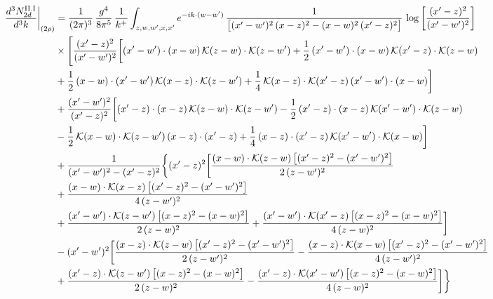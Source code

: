 \documentclass[9pt]{article}
\numberwithin{equation}{section}
\begin{document}
\begin{align}
\frac{d^{3}N^{\rm II.I}_{2d}}{d^{3}k}\bigg|_{(2\rho)}&= \frac{1}{(2\pi)^{3}}\,\frac{g^{4}}{8\pi^{5}}\,\frac{1}{k^{+}}\int_{z,w,w^{\prime},x,x^{\prime}}e^{-ik\cdot(w-w^{\prime})}\,\frac{1}{\big[(x^{\prime}-w^{\prime})^{2}\,(x-z)^{2}-(x-w)^{2}\,(x^{\prime}-z)^{2}\big]}\,\log\left[\frac{(x^{\prime}-z)^{2}}{(x^{\prime}-w^{\prime})^{2}}\right]\notag\\
&\times\Bigg[\frac{(x^{\prime}-z)^{2}}{(x^{\prime}-w^{\prime})^{2}}\bigg[(x^{\prime}-w^{\prime})\cdot(x-w)\,\mathcal{K}(z-w)\cdot\mathcal{K}(z-w^{\prime})+\frac{1}{2}\,(x^{\prime}-w^{\prime})\cdot(x-w)\,\mathcal{K}(x^{\prime}-z)\cdot\mathcal{K}(z-w)\notag \\ & +\frac{1}{2}\,(x-w)\cdot(x^{\prime}-w^{\prime})\,\mathcal{K}(x-z)\cdot\mathcal{K}(z-w^{\prime})+\frac{1}{4}\,\mathcal{K}(x-z)\cdot\mathcal{K}(x^{\prime}-z)\,(x^{\prime}-w^{\prime})\cdot(x-w)\bigg]\notag\\
&+\frac{(x^{\prime}-w^{\prime})^{2}}{(x^{\prime}-z)^{2}}\bigg[(x^{\prime}-z)\cdot(x-z)\,\mathcal{K}(z-w)\cdot\mathcal{K}(z-w^{\prime})-\frac{1}{2}\,(x^{\prime}-z)\cdot(x-z)\,\mathcal{K}(x^{\prime}-w^{\prime})\cdot\mathcal{K}(z-w)\notag \\ & -\frac{1}{2}\,\mathcal{K}(x-w)\cdot\mathcal{K}(z-w^{\prime})\,(x-z)\cdot(x^{\prime}-z)+\frac{1}{4}\,(x-z)\cdot(x^{\prime}-z)\,\mathcal{K}(x^{\prime}-w^{\prime})\cdot\mathcal{K}(x-w)\bigg]\notag\\
&+\frac{1}{(x^{\prime}-w^{\prime})^{2}-(x^{\prime}-z)^{2}}\bigg\{(x^{\prime}-z)^{2}\bigg[\frac{(x-w)\cdot\mathcal{K}(z-w)\,\big[(x^{\prime}-z)^{2}-(x^{\prime}-w^{\prime})^{2}\big]}{2\,(z-w^{\prime})^{2}}\notag\\ &+\frac{(x-w)\cdot\mathcal{K}(x-z)\,\big[(x^{\prime}-z)^{2}-(x^{\prime}-w^{\prime})^{2}\big]}{4\,(z-w^{\prime})^{2}}\notag \\ & +\frac{(x^{\prime}-w^{\prime})\cdot\mathcal{K}(z-w^{\prime})\,\big[(x-z)^{2}-(x-w)^{2}\big]}{2\,(z-w)^{2}}+\frac{(x^{\prime}-w^{\prime})\cdot\mathcal{K}(x^{\prime}-z)\,\big[(x-z)^{2}-(x-w)^{2}\big]}{4\,(z-w)^{2}}\bigg]\notag\\
&-(x^{\prime}-w^{\prime})^{2}\bigg[\frac{(x-z)\cdot\mathcal{K}(z-w)\,\big[(x^{\prime}-z)^{2}-(x^{\prime}-w^{\prime})^{2}\big]}{2\,(z-w^{\prime})^{2}}-\frac{(x-z)\cdot\mathcal{K}(x-w)\,\big[(x^{\prime}-z)^{2}-(x^{\prime}-w^{\prime})^{2}\big]}{4\,(z-w^{\prime})^{2}}\notag \\ & +\frac{(x^{\prime}-z)\cdot\mathcal{K}(z-w^{\prime})\,\big[(x-z)^{2}-(x-w)^{2}\big]}{2\,(z-w)^{2}}-\frac{(x^{\prime}-z)\cdot\mathcal{K}(x^{\prime}-w^{\prime})\,\big[(x-z)^{2}-(x-w)^{2}\big]}{4\,(z-w)^{2}}\bigg]\bigg\}\notag\\

\end{align}
\end{document}
